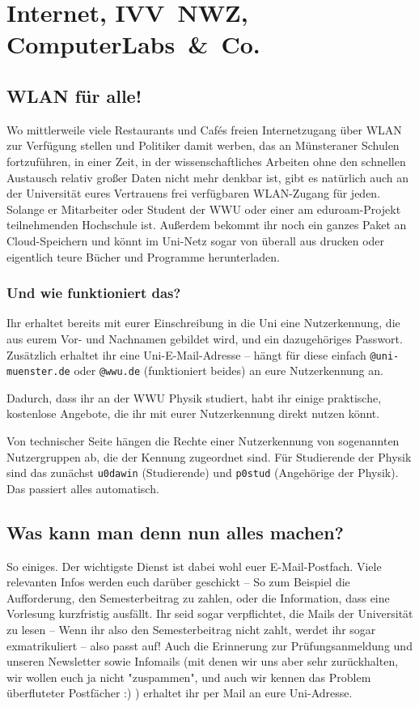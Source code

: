 \section{Internet, IVV~NWZ, Computer\-Labs~\&~Co.}
\begin{multicols*}{2}
\subsection{WLAN für alle!}
Wo mittlerweile viele Restaurants und Cafés freien Internetzugang über WLAN zur Verfügung stellen und Politiker damit werben, das an Münsteraner Schulen fortzuführen, in einer Zeit, in der wissenschaftliches Arbeiten ohne den schnellen Austausch relativ großer Daten nicht mehr denkbar ist, gibt es natürlich auch an der Universität eures Vertrauens frei verfügbaren WLAN-Zugang für jeden. Solange er Mitarbeiter oder Student der WWU oder einer am eduroam-Projekt teilnehmenden Hochschule ist.
Außerdem bekommt ihr noch ein ganzes Paket an Cloud-Speichern und könnt im Uni-Netz sogar von überall aus drucken oder eigentlich teure Bücher und Programme herunterladen.

\subsubsection{Und wie funktioniert das?}
Ihr erhaltet bereits mit eurer Einschreibung in die Uni eine Nutzerkennung, die aus eurem Vor- und Nachnamen gebildet wird, und ein dazugehöriges Passwort.
Zusätzlich erhaltet ihr eine Uni-E-Mail-Adresse -- hängt für diese einfach \texttt{@uni-muenster.de} oder \texttt{@wwu.de} (funktioniert beides) an eure Nutzerkennung an.

Dadurch, dass ihr an der WWU Physik studiert, habt ihr einige praktische, kostenlose Angebote, die ihr mit eurer Nutzerkennung direkt nutzen könnt.

Von technischer Seite hängen die Rechte einer Nutzerkennung von sogenannten Nutzergruppen ab, die der Kennung zugeordnet sind. Für Studierende der Physik sind das zunächst \texttt{u0dawin} (Studierende) und \texttt{p0stud} (Angehörige der Physik). Das passiert alles automatisch.

\subsection{Was kann man denn nun alles machen?}
So einiges. Der wichtigste Dienst ist dabei wohl euer E-Mail-Postfach.
Viele relevanten Infos werden euch darüber geschickt -- So zum Beispiel die Aufforderung, den Semesterbeitrag zu zahlen, oder die Information, dass eine Vorlesung kurzfristig ausfällt.
Ihr seid sogar verpflichtet, die Mails der Universität zu lesen -- Wenn ihr also den Semesterbeitrag nicht zahlt, werdet ihr sogar exmatrikuliert -- also passt auf! Auch die Erinnerung zur Prüfungsanmeldung und unseren Newsletter sowie Infomails (mit denen wir uns aber sehr zurückhalten, wir wollen euch ja nicht "zuspammen", und auch wir kennen das Problem überfluteter Postfächer :) ) erhaltet ihr per Mail an eure Uni-Adresse.


\end{multicols*}
